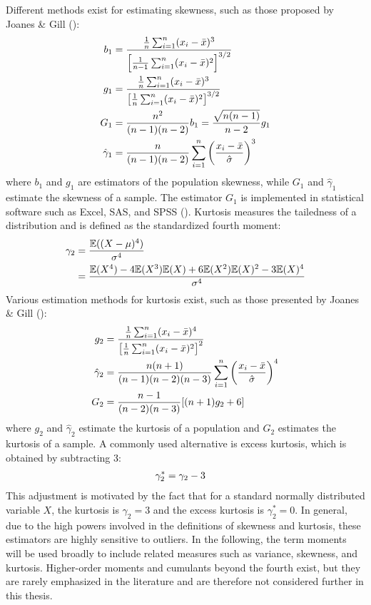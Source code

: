 Different methods exist for estimating skewness, such as those proposed by Joanes \& Gill (\citeyear{joanesComparingMeasuresSample1998}):
\begin{align}
    b_1 &= \frac{\frac{1}{n}\sum_{i=1}^{n}(x_i-\bar{x})^3}{\left[\frac{1}{n-1}\sum_{i=1}^{n}(x_i-\bar{x})^2\right]^{3/2}} \notag \\
    g_1 &= \frac{\frac{1}{n}\sum_{i=1}^{n}(x_i-\bar{x})^3}{\left[\frac{1}{n}\sum_{i=1}^{n}(x_i-\bar{x})^2\right]^{3/2}} \notag \\
    G_1 &= \frac{n^2}{(n-1)(n-2)}b_1 = \frac{\sqrt{n(n-1)}}{n-2}g_1 \notag \\
    \hat{\gamma}_1 &= \frac{n}{(n-1)(n-2)}\sum_{i=1}^n \left(\frac{x_i-\bar{x}}{\hat{\sigma}}\right)^3 \notag
\end{align}
where $b_1$ and $g_1$ are estimators of the population skewness, while $G_1$ and $\hat{\gamma}_1$ estimate the skewness of a sample. The estimator $G_1$ is implemented in statistical software such as Excel, SAS, and SPSS (\cite{doaneMeasuringSkewnessForgotten2011}). Kurtosis measures the tailedness of a distribution and is defined as the standardized fourth moment:
\begin{align}
    \label{eq:definition_kurtosis}
    \gamma_2 &= \frac{\mathbb{E}((X-\mu)^4)}{\sigma^4} \\
    &= \frac{\mathbb{E}(X^4) - 4\mathbb{E}(X^3)\mathbb{E}(X) + 6\mathbb{E}(X^2)\mathbb{E}(X)^2 - 3\mathbb{E}(X)^4}{\sigma^4} \notag
\end{align}
Various estimation methods for kurtosis exist, such as those presented by Joanes \& Gill (\citeyear{joanesComparingMeasuresSample1998}):
\begin{align}
    g_2 &= \frac{\frac{1}{n}\sum_{i=1}^{n}(x_i-\bar{x})^4}{\left[\frac{1}{n}\sum_{i=1}^{n}(x_i-\bar{x})^2\right]^2} \notag \\
    \hat{\gamma}_2 &= \frac{n(n+1)}{(n-1)(n-2)(n-3)}\sum_{i=1}^n \left(\frac{x_i-\bar{x}}{\hat{\sigma}}\right)^4 \notag \\
    G_2 &= \frac{n-1}{(n-2)(n-3)}[(n+1)g_2 + 6] \notag
\end{align}
where $g_2$ and $\hat{\gamma}_2$ estimate the kurtosis of a population and $G_2$ estimates the kurtosis of a sample. A commonly used alternative is excess kurtosis, which is obtained by subtracting 3:
\begin{align}
    \gamma_2^* &= \gamma_2 - 3\notag
\end{align}
This adjustment is motivated by the fact that for a standard normally distributed variable $X$, the kurtosis is $\gamma_2 = 3$ and the excess kurtosis is $\gamma_2^* = 0$. In general, due to the high powers involved in the definitions of skewness and kurtosis, these estimators are highly sensitive to outliers. In the following, the term moments will be used broadly to include related measures such as variance, skewness, and kurtosis. Higher-order moments and cumulants beyond the fourth exist, but they are rarely emphasized in the literature and are therefore not considered further in this thesis.

